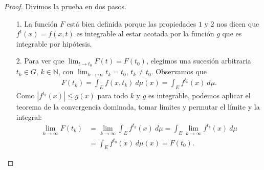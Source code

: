 \begin{proof}
    Divimos la prueba en dos pasos.
    \begin{enumerate}
        \item[1.] La función $F$ está bien definida porque las propiedades $1$ y $2$ nos dicen que $f^t(x) = f(x,t)$ es integrable al estar acotada por la función $g$ que es integrable por hipótesis.
        \item[2.] Para ver que  $\lim_{t \to t_0}{F(t)} = F(t_0)$, elegimos una sucesión arbitraria $t_k \in G$, $k \in \mathbb{N}$, con $\lim_{k \to \infty}{t_k} = t_0$, $t_k \not = t_0$. Observamos que
              \begin{align*}
                  F(t_k) = \int_{E}{f(x,t_k) \ d\mu(x)} = \int_{E}{f^{t_k}(x) \ d\mu}.
              \end{align*}
              Como $|f^{t_k}(x)| \leq g(x)$ para todo $k$ y $g$ es integrable, podemos aplicar el teorema de la convergencia dominada, tomar límites y permutar el límite y la integral:
              \begin{align*}
                  \lim_{k \to \infty}{F(t_k)} & = \lim_{k \to \infty}{\int_{E}{f^{t_k}(x) \ d\mu}} = \int_{E}{\lim_{k \to \infty}{}f^{t_k}(x) \ d\mu} \\
                                              & = \int_{E}{f^{t_0}(x) \ d\mu(x)} = F(t_0).
              \end{align*}
    \end{enumerate}
\end{proof}

